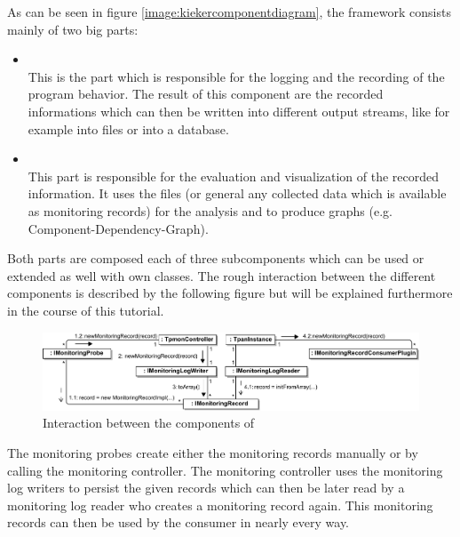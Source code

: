 \documentclass[a4paper, oneside, 11pt]{scrartcl}
\begin{document}
      As can be seen in figure \ref{image:kiekercomponentdiagram}, the framework consists mainly of two big parts:
      \begin{itemize}
	\item \textbf{\KiekerMonitoring}\\
	  This is the part which is responsible for the logging and the recording of the program behavior. The result of this component are the recorded informations which can then be written into different output streams, like for example into files or into a database.
	\item \textbf{\KiekerAnalysis}\\
	  This part is responsible for the evaluation and visualization of the recorded information. It uses the files (or general any collected data which is available as monitoring records) for the analysis and to produce graphs (e.g. Component-Dependency-Graph).
      \end{itemize}
      Both parts are composed each of three subcomponents which can be used or extended as well with own classes. The rough interaction between the different components is described by the following figure but will be explained furthermore in the course of this tutorial.
      \begin{figure}[H]
	\begin{center}
	  \includegraphics[width=1.0\textwidth]{kiekerCommunications-revisedReArranged-woMonitoringLog-bw.pdf}
	  \caption{Interaction between the components of \Kieker}
	\end{center}
      \end{figure}
      The monitoring probes create either the monitoring records manually or by calling the monitoring controller. The monitoring controller uses the monitoring log writers to persist the given records which can then be later read by a monitoring log reader who creates a monitoring record again. This monitoring records can then be used by the consumer in nearly every way.
\end{document}
